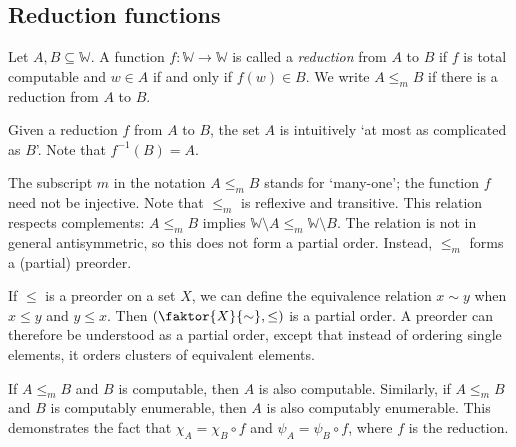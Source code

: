 \subsection{Reduction functions}
\begin{definition}
	Let \( A, B \subseteq \mathbb W \).
	A function \( f \colon \mathbb W \to \mathbb W \) is called a \emph{reduction} from \( A \) to \( B \) if \( f \) is total computable and \( w \in A \) if and only if \( f(w) \in B \).
	We write \( A \leq_m B \) if there is a reduction from \( A \) to \( B \).
\end{definition}
\begin{remark}
	Given a reduction \( f \) from \( A \) to \( B \), the set \( A \) is intuitively `at most as complicated as \( B \)'.
	Note that \( f^{-1}(B) = A \).
\end{remark}
The subscript \( m \) in the notation \( A \leq_m B \) stands for `many-one'; the function \( f \) need not be injective.
Note that \( \leq_m \) is reflexive and transitive.
This relation respects complements: \( A \leq_m B \) implies \( \mathbb W \setminus A \leq_m \mathbb W \setminus B \).
The relation is not in general antisymmetric, so this does not form a partial order.
Instead, \( \leq_m \) forms a (partial) preorder.

If \( \leq \) is a preorder on a set \( X \), we can define the equivalence relation \( x \sim y \) when \( x \leq y \) and \( y \leq x \).
Then \( \qty(\faktor{X}{\sim}, \leq) \) is a partial order.
A preorder can therefore be understood as a partial order, except that instead of ordering single elements, it orders clusters of equivalent elements.

If \( A \leq_m B \) and \( B \) is computable, then \( A \) is also computable.
Similarly, if \( A \leq_m B \) and \( B \) is computably enumerable, then \( A \) is also computably enumerable.
This demonstrates the fact that \( \chi_A = \chi_B \circ f \) and \( \psi_A = \psi_B \circ f \), where \( f \) is the reduction.

